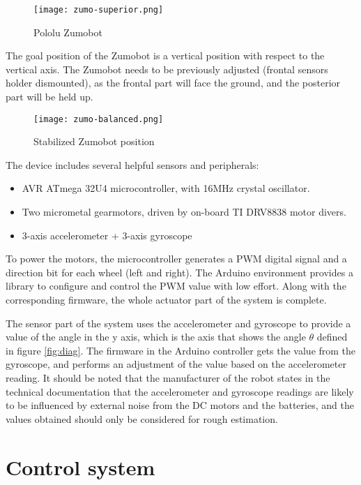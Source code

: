 \begin{figure}[h]
	\centering
	\texttt{[image: zumo-superior.png]}
	\caption{Pololu Zumobot}\label{fig:zumo}
\end{figure}

The goal position of the Zumobot is a vertical position with respect to the vertical axis. The Zumobot needs to be previously adjusted (frontal sensors holder dismounted), as the frontal part will face the ground, and the posterior part will be held up.

\begin{figure}[h]
	\centering
	\texttt{[image: zumo-balanced.png]}
	\caption{Stabilized Zumobot position}\label{fig:zumoStable}
\end{figure}

The device includes several helpful sensors and peripherals:

\begin{itemize}
	\item AVR ATmega 32U4 microcontroller, with 16MHz crystal oscillator.
	\item Two micrometal gearmotors, driven by on-board TI DRV8838 motor divers.
	\item 3-axis accelerometer + 3-axis gyroscope
\end{itemize}

To power the motors, the microcontroller generates a PWM digital signal and a direction bit for each wheel (left and right). The Arduino environment provides a library to configure and control the PWM value with low effort. Along with the corresponding firmware, the whole actuator part of the system is complete.

The sensor part of the system uses the accelerometer and gyroscope to provide a value of the angle in the y axis, which is the axis that shows the angle $\theta$ defined in figure \ref{fig:diag}. The firmware in the Arduino controller gets the value from the gyroscope, and performs an adjustment of the value based on the accelerometer reading. It should be noted that the manufacturer of the robot states in the technical documentation\cite{POL01} that the accelerometer and gyroscope readings are likely to be influenced by external noise from the DC motors and the batteries, and the values obtained should only be considered for rough estimation.

\section{Control system}

